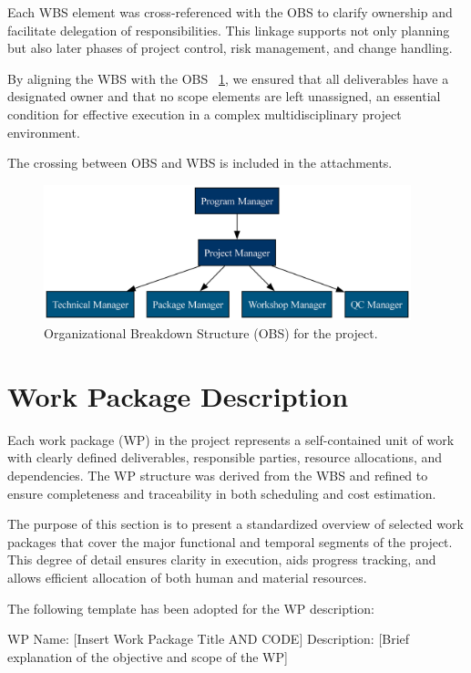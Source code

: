\documentclass[12pt]{article}
\begin{document}
Each WBS element was cross-referenced with the OBS to clarify ownership and facilitate delegation of responsibilities. This linkage supports not only planning but also later phases of project control, risk management, and change handling.

By aligning the WBS with the OBS ~\ref{fig:obs}, we ensured that all deliverables have a designated owner and that no scope elements are left unassigned, an essential condition for effective execution in a complex multidisciplinary project environment.

The crossing between OBS and WBS is included in the attachments.

\begin{figure}[H]
        \centering
        \includegraphics[width=0.95\textwidth]{../OBS.png}
        \caption{Organizational Breakdown Structure (OBS) for the project.}
        \label{fig:obs}
\end{figure}


\section{Work Package Description}

Each work package (WP) in the project represents a self-contained unit of work with clearly defined deliverables, responsible parties, resource allocations, and dependencies. The WP structure was derived from the WBS and refined to ensure completeness and traceability in both scheduling and cost estimation.

The purpose of this section is to present a standardized overview of selected work packages that cover the major functional and temporal segments of the project. This degree of detail ensures clarity in execution, aids progress tracking, and allows efficient allocation of both human and material resources.

The following template has been adopted for the WP description:

WP Name: [Insert Work Package Title AND CODE]
Description:
[Brief explanation of the objective and scope of the WP]
\end{document}
